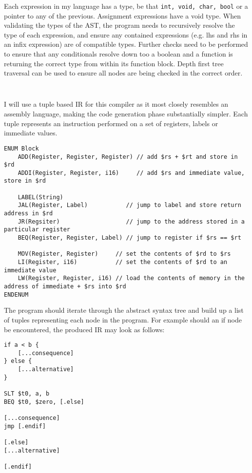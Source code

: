 Each expression in my language has a type, be that \texttt{int, void, char, bool} or a pointer to any of the previous. Assignment expressions have a void type. When validating the types of the AST, the program needs to recursively resolve the type of each expression, and ensure any contained expressions (e.g. lhs and rhs in an infix expression) are of compatible types. Further checks need to be performed to ensure that any conditionals resolve down too a boolean and a function is returning the correct type from within its function block. Depth first tree traversal can be used to ensure all nodes are being checked in the correct order.

\begin{lstlisting}
    
\end{lstlisting}

I will use a tuple based IR for this compiler as it most closely resembles an assembly language, making the code generation phase substantially simpler. Each tuple represents an instruction performed on a set of registers, labels or immediate values.

\begin{lstlisting}
ENUM Block
    ADD(Register, Register, Register) // add $rs + $rt and store in $rd
    ADDI(Register, Register, i16)     // add $rs and immediate value, store in $rd

    LABEL(String)
    JAL(Register, Label)           // jump to label and store return address in $rd
    JR(Regsiter)                   // jump to the address stored in a particular register 
    BEQ(Register, Register, Label) // jump to register if $rs == $rt

    MOV(Register, Register)     // set the contents of $rd to $rs
    LI(Register, i16)           // set the contents of $rd to an immediate value 
    LW(Register, Register, i16) // load the contents of memory in the address of immediate + $rs into $rd
ENDENUM
\end{lstlisting}

The program should iterate through the abstract syntax tree and build up a list of tuples representing each node in the program. For example should an if node be encountered, the produced IR may look as follows:

\begin{lstlisting}
if a < b {
    [...consequence]
} else {
    [...alternative]
}

SLT $t0, a, b
BEQ $t0, $zero, [.else]

[...consequence] 
jmp [.endif]

[.else]
[...alternative] 

[.endif]
\end{lstlisting}

